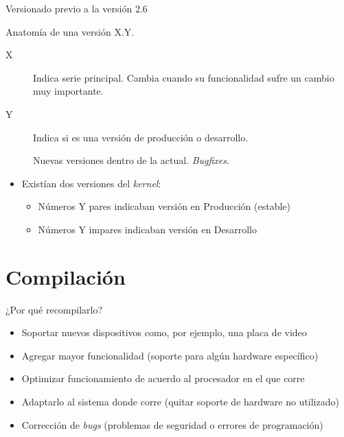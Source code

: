\begin{frame}{Versionado previo a la versión 2.6}
  \begin{block}{Anatomía de una versión}
    \alert{X}.\alert{Y}.
  \end{block}
  \begin{description}

  \item[\alert{X}] Indica serie principal. Cambia cuando su funcionalidad
    sufre un cambio muy importante.

  \item[\alert{Y}] Indica si es una versión de producción o desarrollo.
  \item[] Nuevas versiones dentro de la
    actual. \textit{Bugfixes}.
  \end{description}
  \begin{itemize}
  \item Existían dos versiones del \textit{kernel}:
    \begin{itemize}
    \item Números \alert{Y} pares indicaban versión en Producción (estable)
    \item Números \alert{Y} impares indicaban versión en Desarrollo
    \end{itemize}    
  \end{itemize}
\end{frame}

\section{Compilación}
\begin{frame}{¿Por qué recompilarlo?}
\begin{itemize}
\item Soportar \alert{nuevos dispositivos} como, por ejemplo, una placa de
  video

\item Agregar \alert{mayor funcionalidad} (soporte para algún hardware
  específico)

\item Optimizar funcionamiento de acuerdo al \alert{procesador en el que
    corre}

\item \alert{Adaptarlo} al sistema donde corre (quitar soporte de hardware no utilizado)

\item \alert{Corrección} de \textit{bugs} (problemas de seguridad o errores de programación)
\end{itemize}
\end{frame}

